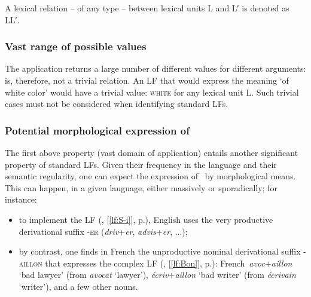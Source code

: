\begin{soundboxnotitle}

A lexical relation  -- of any type -- between lexical units L and L′ is denoted as L\thinspace{}\thinspace L′.

\end{soundboxnotitle}

\subsubsection{Vast range of possible values}\label{sec:vastRangeOfValues}

The application  returns a large number of different values for different arguments:  is, therefore, not a trivial relation. An LF that would express the meaning `of white color' would have a trivial value: \textsc{white} for any lexical unit L. Such trivial cases must not be considered when identifying standard LFs.

\subsubsection{Potential morphological expression of \sigmaF}\label{sec:morphologicalExpressionSigmaF}

The first above property (vast domain of application) entails another significant property of standard LFs. Given their frequency in the language and their semantic regularity, one can expect the expression of \sigmaF\ by morphological means. This can happen, in a given language, either massively or sporadically; for instance:

\begin{itemize}

\item to implement the LF  (, [\ref{lf:S-i}], p.\thinspace\pageref{lf:S-i}), English uses the very productive derivational suffix \textsc{-er} (\textit{driv}+\textit{er}, \textit{advis}+\textit{er}, ...);

\item by contrast, one finds in French the unproductive nominal derivational suffix \mbox{\textsc{-aillon}} that expresses the complex LF  (, [\ref{lf:Bon}], p.\thinspace\pageref{lf:Bon}): {\smaller French}~\textit{avoc}+\textit{aillon} `bad lawyer' (from \textit{avocat} `lawyer'), \textit{écriv}+\textit{aillon} `bad writer' (from \textit{écrivain} `writer'), and a few other nouns.

\end{itemize}

